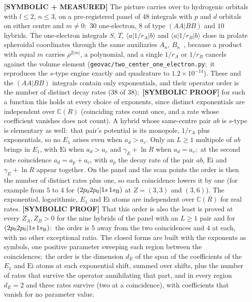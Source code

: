 \documentclass[aps,pra,twocolumn,superscriptaddress,longbibliography]{revtex4-2}
\begin{document}
\textbf{[SYMBOLIC + MEASURED]} The picture carries over to hydrogenic orbitals with
$l \le 2$, $n \le 3$, on a pre-registered panel of $48$ integrals with $p$ and $d$
orbitals on either centre and $m \neq 0$:\ $30$ one-electron, $8$ of type $(AA|BB)$ and
$10$ hybrids.  The one-electron integrals $S$, $T$, $\langle a|1/r_A|b\rangle$ and
$\langle a|1/r_B|b\rangle$ close in prolate spheroidal coordinates through the same
auxiliaries $A_n$, $B_n$~\cite{mulliken1949,roothaan1951}, because a product with equal
$m$ carries $\rho^{2|m|}$, a polynomial, and a single $1/r_A$ or $1/r_B$ cancels against
the volume element (\texttt{geovac/two\_center\_one\_electron.py};\ it reproduces the
$s$-type engine exactly and quadrature to $1.2\times10^{-14}$).  These and the $(AA|BB)$
integrals contain only exponentials, and their operator order is the number of distinct
decay rates ($38$ of $38$);\ \textbf{[SYMBOLIC PROOF]} for such a function this holds at every choice
of exponents, since distinct exponentials are independent over $\mathbb{C}(R)$ (coinciding rates
count once, and a rate whose coefficient vanishes does not count).  A hybrid whose same-centre pair $ab$ is $s$-type is
elementary as well:\ that pair's potential is its monopole, $1/r_A$ plus exponentials,
so no $E_1$ arises even when $a_d > a_c$.  Only an $L \ge 1$ multipole of $ab$ brings in
$E_1$, with $\mathrm{Ei}$ when $a_d > a_c$ and $\gamma_E + \ln R$ when $a_d = a_c$;\ at the
second rate coincidence $a_d = a_p + a_c$, with $a_p$ the decay rate of the pair $ab$, $\mathrm{Ei}$ and
$\gamma_E + \ln R$ appear together.  On the panel and the scan points the order is then the number of distinct rates plus one, so
each coincidence lowers it by one (for example from $5$ to $4$ for
$(2p_0 2p_0|1s\,1s_{\rm B})$ at $Z=(3,3)$ and $(3,6)$).  The exponential, logarithmic, $E_1$ and
$\mathrm{Ei}$ atoms are independent over $\mathbb{C}(R)$ for real rates.  \textbf{[SYMBOLIC PROOF]}
That this order is also the least is proved at every $Z_A,Z_B>0$ for the nine hybrids of the
panel with an $L\ge1$ pair and for $(2p_0 2p_0|1s\,1s_{\rm B})$:\ the order is $5$ away from the
two coincidences and $4$ at each, with no other exceptional ratio.  The closed forms are built
with the exponents as symbols, one positive parameter sweeping each region between the
coincidences;\ the order is the dimension $d_E$ of the span of the coefficients of the $E_1$ and
$\mathrm{Ei}$ atoms at each exponential shift, summed over shifts, plus the number of rates
that survive the operator annihilating that part, and in every region $d_E=2$ and three
rates survive (two at a coincidence), with coefficients that vanish for no parameter value.
\end{document}
